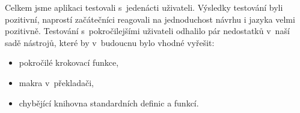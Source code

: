 Celkem jsme aplikaci testovali s~jedenácti uživateli. Výsledky testování byli pozitivní, naprostí začátečníci reagovali na jednoduchost návrhu i jazyka velmi pozitivně. Testování s~pokročilejšími uživateli odhalilo pár nedostatků v~naší sadě nástrojů, které by v~budoucnu bylo vhodné vyřešit:

\begin{itemize}
	\item pokročilé krokovací funkce,
	\item makra v~překladači,
	\item chybějící knihovna standardních definic a funkcí.
\end{itemize}

